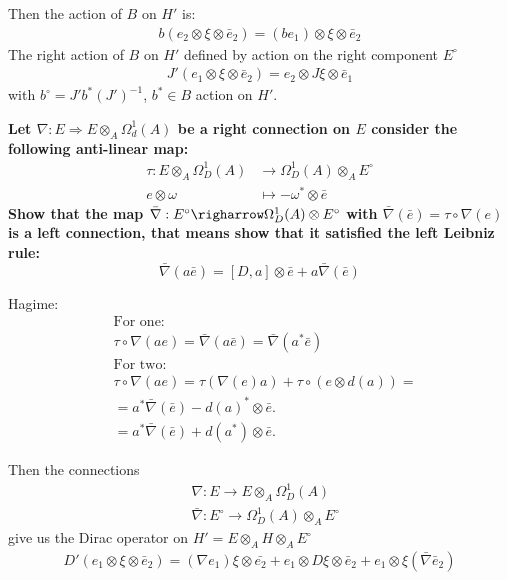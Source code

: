\documentclass[a4paper]{article}
\newcounter{exercise}
\newenvironment{MyExercise}%
{\begin{mdframed}[style=exercisestyle]}{\end{mdframed}}
\theoremstyle{definition}
\theoremstyle{definition}
\theoremstyle{definition}
\theoremstyle{theorem}
\theoremstyle{theorem}
\begin{document}
Then the action of $B$ on $H'$ is:
\begin{align}
    b(e_2 \otimes \xi \otimes \bar{e}_2 ) = (be_1) \otimes \xi \otimes
    \bar{e}_2
\end{align}
The right action of $B$ on $H'$ defined by action on the right component
$E^\circ$
\begin{align}
    J'(e_1 \otimes \xi \otimes \bar{e}_2) = e_2 \otimes J \xi \otimes
    \bar{e}_1
\end{align}
with $b^\circ = J' b^* (J')^{-1}$, $b^* \in B$ action on $H'$.
\newline


\newpage
\begin{MyExercise}
    \textbf{ Let $\nabla : E \Rightarrow E \otimes _A \Omega _d^1 (A)$ be a right connection on $E$
    consider the following anti-linear map:
    \begin{align}
        \tau : E \otimes_A \Omega _D^1 (A) &\rightarrow \Omega _D^1 (A) \otimes_A E^\circ\\
                e \otimes \omega &\mapsto -\omega ^* \otimes \bar{e}
    \end{align}
    Show that the map $\bar{\nabla} : E^\circ \righarrow \Omega _D^1(A) \otimes E^\circ$
    with $\bar{\nabla}(\bar{e}) = \tau \circ \nabla(e)$ is a left connection, that means
    show that it satisfied the left Leibniz rule:
    \begin{equation}
        \bar{\nabla}(a\bar{e}) = [D, a] \otimes \bar{e} + a \bar{\nabla}(\bar{e})
    \end{equation}
    }\newline


    Hagime:
    \begin{align*}
        &\text{For one:}\\
        &\tau \circ \nabla(ae) = \bar{\nabla}(a\bar{e}) = \bar{\nabla}(a^* \bar{e})\\
        &\text{For two:}\\
         &\tau \circ \nabla(ae) = \tau(\nabla(e)a) + \tau \circ(e \otimes d(a))=\\
         &=a^*\bar{\nabla}(\bar{e}) - d(a)^* \otimes \bar{e}. \\
         &= a^*\bar{\nabla}(\bar{e}) + d(a^*) \otimes \bar{e}.
    \end{align*}
\end{MyExercise}
Then the connections
\begin{align}
    &\nabla: E \rightarrow E\otimes _A \Omega _D ^1(A) \\
    &\bar{\nabla}:E^\circ \rightarrow \Omega _D^1(A) \otimes _A E^\circ
\end{align}
give us the Dirac operator on $H' = E \otimes _A H \otimes _A E^\circ$
\begin{align}
    D'(e_1 \otimes \xi \otimes \bar{e}_2) = (\nabla e_1) \xi \otimes
    \bar{e_2}+ e_1 \otimes D\xi \otimes \bar{e}_2 + e_1 \otimes
    \xi(\bar{\nabla}\bar{e}_2)
\end{align}
\end{document}
